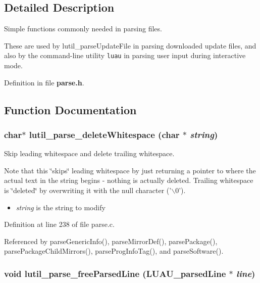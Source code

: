 \subsection{Detailed Description}
Simple functions commonly needed in parsing files. 

These are used by lutil\_\-parse\-Update\-File in parsing downloaded update files, and also by the command-line utility {\tt luau} in parsing user input during interactive mode.

Definition in file {\bf parse.h}.

\subsection{Function Documentation}
\subsubsection{\setlength{\rightskip}{0pt plus 5cm}char$\ast$ lutil\_\-parse\_\-delete\-Whitespace (char $\ast$ {\em string})}\label{parse_8h_a6}


Skip leading whitespace and delete trailing whitespace. 

Note that this \char`\"{}skips\char`\"{} leading whitespace by just returning a pointer to where the actual text in the string begins - nothing is actually deleted. Trailing whitespace is \char`\"{}deleted\char`\"{} by overwriting it with the null character ('$\backslash$0').

\begin{itemize}
\item {\em string\/} is the string to modify 
\end{itemize}


Definition at line 238 of file parse.c.

Referenced by parse\-Generic\-Info(), parse\-Mirror\-Def(), parse\-Package(), parse\-Package\-Child\-Mirrors(), parse\-Prog\-Info\-Tag(), and parse\-Software().
\subsubsection{\setlength{\rightskip}{0pt plus 5cm}void lutil\_\-parse\_\-free\-Parsed\-Line ({\bf LUAU\_\-parsed\-Line} $\ast$ {\em line})}\label{parse_8h_a3}


